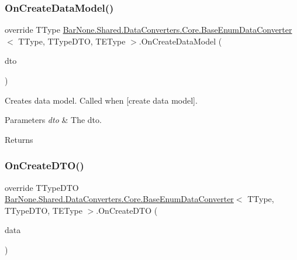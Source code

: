 \subsubsection{\texorpdfstring{On\+Create\+Data\+Model()}{OnCreateDataModel()}}
{\footnotesize\ttfamily override T\+Type \mbox{\hyperlink{class_bar_none_1_1_shared_1_1_data_converters_1_1_core_1_1_base_enum_data_converter}{Bar\+None.\+Shared.\+Data\+Converters.\+Core.\+Base\+Enum\+Data\+Converter}}$<$ T\+Type, T\+Type\+D\+TO, T\+E\+Type $>$.On\+Create\+Data\+Model (\begin{DoxyParamCaption}\item[{T\+Type\+D\+TO}]{dto }\end{DoxyParamCaption})}



Creates data model. Called when \mbox{[}create data model\mbox{]}. 


\begin{DoxyParams}{Parameters}
{\em dto} & The dto.\\
\hline
\end{DoxyParams}
\begin{DoxyReturn}{Returns}

\end{DoxyReturn}
\mbox{\label{class_bar_none_1_1_shared_1_1_data_converters_1_1_core_1_1_base_enum_data_converter_a50527a2d6f85fd644a49f3a3c77d60be}} 
\subsubsection{\texorpdfstring{On\+Create\+D\+T\+O()}{OnCreateDTO()}}
{\footnotesize\ttfamily override T\+Type\+D\+TO \mbox{\hyperlink{class_bar_none_1_1_shared_1_1_data_converters_1_1_core_1_1_base_enum_data_converter}{Bar\+None.\+Shared.\+Data\+Converters.\+Core.\+Base\+Enum\+Data\+Converter}}$<$ T\+Type, T\+Type\+D\+TO, T\+E\+Type $>$.On\+Create\+D\+TO (\begin{DoxyParamCaption}\item[{T\+Type}]{data }\end{DoxyParamCaption})}



